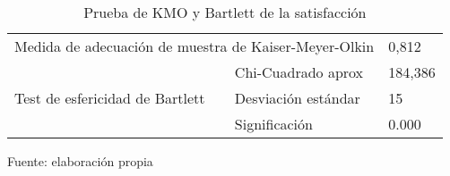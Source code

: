 \begin{table}[h]
    \caption {Prueba de KMO y Bartlett de la satisfacción}
	\label{tab:kmo1}
	\setlength\extrarowheight{5pt}
	
	\begin{tabular}{p{5.7cm} p{4.6cm} p{2.8cm}}
	\toprule
	\multicolumn{2}{c}{Medida de adecuación de muestra de Kaiser-Meyer-Olkin}	& 0,812 \\
									& Chi-Cuadrado aprox	& 184,386 \\
	Test de esfericidad de Bartlett	& Desviación estándar					& 15 \\
									& Significación					& 0.000 \\
	\bottomrule
	\end{tabular}
	
	\center
	\footnotesize
	Fuente: elaboración propia
\end{table}
